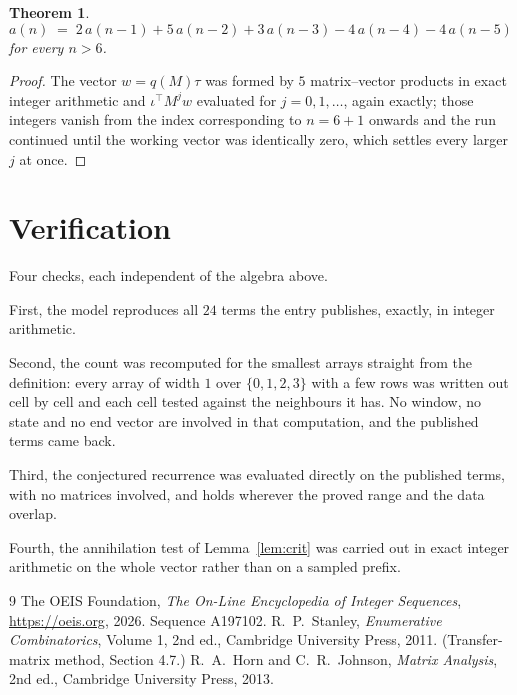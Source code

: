 \documentclass[11pt,a4paper]{article}
\theoremstyle{plain}
\newtheorem{theorem}{Theorem}
\theoremstyle{definition}
\begin{document}
\begin{theorem}
\[
a(n)\;=\;2\,a(n-1) + 5\,a(n-2) + 3\,a(n-3) - 4\,a(n-4) - 4\,a(n-5)
\]
for every $n>6$.
\end{theorem}

\begin{proof}
The vector $w=q(M)\tau$ was formed by $5$ matrix--vector products in exact integer
arithmetic and $\iota^{\!\top}M^{j}w$ evaluated for $j=0,1,\dots$, again exactly; those
integers vanish from the index corresponding to $n=6+1$ onwards and the run continued
until the working vector was identically zero, which settles every larger $j$ at once.
\end{proof}

\section{Verification}

Four checks, each independent of the algebra above.

First, the model reproduces all $24$ terms the entry publishes, exactly, in integer
arithmetic.

Second, the count was recomputed for the smallest arrays straight from the definition: every
array of width $1$ over $\{0,1,2,3\}$ with a few rows was written out cell by cell and each cell
tested against the neighbours it has. No window, no state and no end vector are involved in that
computation, and the published terms came back.

Third, the conjectured recurrence was evaluated directly on the published terms, with no
matrices involved, and holds wherever the proved range and the data overlap.

Fourth, the annihilation test of Lemma~\ref{lem:crit} was carried out in exact integer
arithmetic on the whole vector rather than on a sampled prefix.

\begin{thebibliography}{9}
 The OEIS Foundation, \emph{The On-Line Encyclopedia of Integer
Sequences}, \url{https://oeis.org}, 2026. Sequence A197102.
 R.~P.~Stanley, \emph{Enumerative Combinatorics}, Volume 1, 2nd ed.,
Cambridge University Press, 2011. (Transfer-matrix method, Section 4.7.)
 R.~A.~Horn and C.~R.~Johnson, \emph{Matrix Analysis}, 2nd ed., Cambridge
University Press, 2013.
\end{thebibliography}
\end{document}
